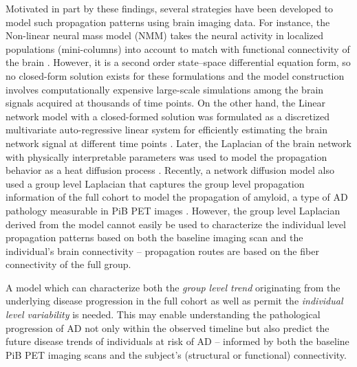 \documentclass{article}
\begin{document}
Motivated in part by these findings, several strategies have been developed to model such propagation patterns using brain imaging data.
For instance, the Non-linear neural mass model (NMM) takes the neural activity in localized populations (mini-columns) into account to match with functional connectivity of the brain \cite{honey_sporns_cammoun_gigandet_thiran_meuli_hagmann_2009}.
However, it is a second order state–space differential equation form, so no closed-form solution exists for these formulations and the model construction involves computationally expensive large-scale simulations among the brain signals acquired at thousands of time points.
On the other hand, the Linear network model with a closed-formed solution was formulated as a discretized multivariate auto-regressive linear system for efficiently estimating the brain network signal at different time points \cite{galan_2008}.
Later, the Laplacian of the brain network with physically interpretable parameters was used to model the propagation behavior as a heat diffusion process \cite{raj_kuceyeski_weiner_2012}. 
Recently, a network diffusion model also used 
a group level Laplacian that captures the group level propagation information of the full cohort to model the propagation of amyloid, a type of AD pathology measurable in PiB PET images  \cite{hwang_ravi_adluru_bendlin_johnson_singh_2018}.
However, the group level Laplacian derived from the model cannot easily
be used to characterize the individual level propagation patterns based on both the baseline imaging scan and the individual's brain connectivity -- propagation routes are based on 
the fiber connectivity of the full group. 

A model which can characterize both the \textit{group level trend}
originating from the underlying disease progression in the full cohort
as well as permit the \textit{individual level variability}
is needed. 
This may enable understanding the pathological progression of AD
not only within the observed timeline but also predict the future disease trends of individuals
at risk of AD -- informed by both the baseline PiB PET imaging scans
and the subject's (structural or functional) connectivity. 
\end{document}
